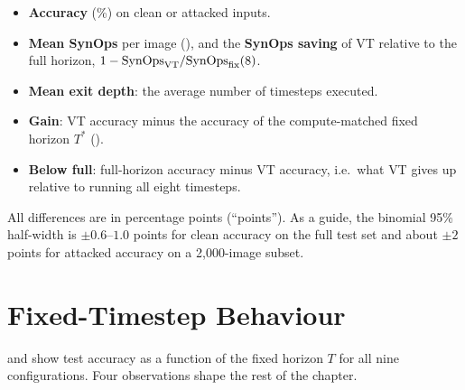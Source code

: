 \begin{itemize}
    \item \textbf{Accuracy} (\%) on clean or attacked inputs.
    \item \textbf{Mean SynOps} per image (), and the \textbf{SynOps saving} of VT relative to the full horizon, $1 - \mathrm{SynOps}_{\mathrm{VT}} / \mathrm{SynOps}_{\mathrm{fix}}(8)$.
    \item \textbf{Mean exit depth}: the average number of timesteps executed.
    \item \textbf{Gain}: VT accuracy minus the accuracy of the compute-matched fixed horizon $T^*$ ().
    \item \textbf{Below full}: full-horizon accuracy minus VT accuracy, i.e.\ what VT gives up relative to running all eight timesteps.
\end{itemize}

All differences are in percentage points (``points''). As a guide, the binomial 95\% half-width is $\pm 0.6$--$1.0$ points for clean accuracy on the full test set and about $\pm 2$ points for attacked accuracy on a 2{,}000-image subset.

\section{Fixed-Timestep Behaviour}
\label{sec:res-fixed}

 and  show test accuracy as a function of the fixed horizon $T$ for all nine configurations. Four observations shape the rest of the chapter.

